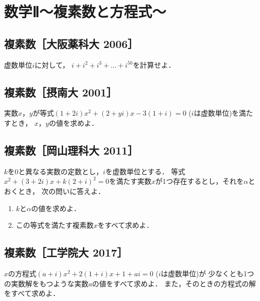 \documentclass[../../ms_q.tex]{subfiles}
\begin{document}
\setlength{\abovedisplayskip}{2mm}
\setlength{\belowdisplayskip}{1mm}

\section{数学Ⅱ～複素数と方程式～}

\subsection{複素数［大阪薬科大 2006］}

虚数単位$i$に対して，
$i+i^2+i^3+ \dots +i^{50}$を計算せよ．

\vspace{2cm}
\vfill

\subsection{複素数［摂南大 2001］}

実数$x$，$y$が等式$(1+2i)x^2+(2+yi)x-3(1+i)=0$ ($i$は虚数単位)を満たすとき，
$x$，$y$の値を求めよ．

\vspace{2cm}
\vfill

\subsection{複素数［岡山理科大 2011］}

$k$を0と異なる実数の定数とし，$i$を虚数単位とする．
等式$x^2+(3+2i)x+k(2+i)^2=0$を満たす実数$x$が1つ存在するとし，それを$\alpha$とおくとき，
次の問いに答えよ．

\begin{enumerate}
    \item $k$と$\alpha$の値を求めよ．
    \item この等式を満たす複素数$x$をすべて求めよ．
\end{enumerate}

\vspace{2cm}
\vfill

\subsection{複素数［工学院大 2017］}

$x$の方程式$(a+i)x^2+2(1+i)x+1+ai=0$ ($i$は虚数単位)が
少なくとも1つの実数解をもつような実数$a$の値をすべて求めよ．
また，そのときの方程式の解をすべて求めよ．

\vspace{2cm}
\vfill
\end{document}
